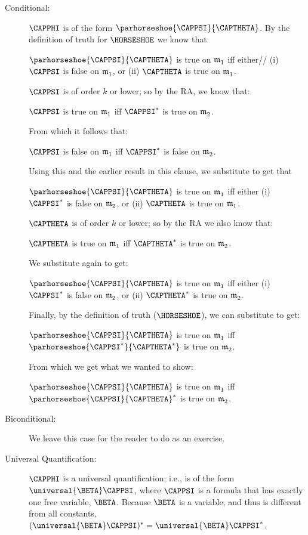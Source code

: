\begin{PROOF}
\begin{description}
\begin{description}
\item[Conditional:] $\CAPPHI$ is of the form $\parhorseshoe{\CAPPSI}{\CAPTHETA}$. By the definition of truth for $\HORSESHOE$ we know that
\begin{center}
$\parhorseshoe{\CAPPSI}{\CAPTHETA}$ is true on $\mathfrak{m^{\mathrm{}}_{\mathrm{1}}}$
  iff  either//
   (i) $\CAPPSI$ is false on $\mathfrak{m^{\mathrm{}}_{\mathrm{1}}}$, or (ii)
   $\CAPTHETA$ is true on $\mathfrak{m^{\mathrm{}}_{\mathrm{1}}}$.
\end{center}
$\CAPPSI$ is of order $k$ or lower; so by the RA, we know that:
\begin{center}
$\CAPPSI$ is true on $\mathfrak{m^{\mathrm{}}_{\mathrm{1}}}$ iff $\CAPPSI^*$ is true on $\mathfrak{m^{\mathrm{}}_{\mathrm{2}}}$.
\end{center}
From which it follows that:
\begin{center}
$\CAPPSI$ is false on $\mathfrak{m^{\mathrm{}}_{\mathrm{1}}}$ iff $\CAPPSI^*$ is false on $\mathfrak{m^{\mathrm{}}_{\mathrm{2}}}$.
\end{center}
Using this and the earlier result in this clause, we substitute to get that
\begin{center}
$\parhorseshoe{\CAPPSI}{\CAPTHETA}$ is true on $\mathfrak{m^{\mathrm{}}_{\mathrm{1}}}$
  iff  either  
	  (i) $\CAPPSI^*$ is false on $\mathfrak{m^{\mathrm{}}_{\mathrm{2}}}$,
        or (ii) $\CAPTHETA$ is true on $\mathfrak{m^{\mathrm{}}_{\mathrm{1}}}$.
\end{center}
$\CAPTHETA$ is of order $k$ or lower; so by the RA we also know that:
\begin{center}
$\CAPTHETA$ is true on $\mathfrak{m^{\mathrm{}}_{\mathrm{1}}}$ iff $\CAPTHETA^*$ is true on $\mathfrak{m^{\mathrm{}}_{\mathrm{2}}}$.
\end{center}
We substitute again to get:
\begin{center}
$\parhorseshoe{\CAPPSI}{\CAPTHETA}$ is true on $\mathfrak{m^{\mathrm{}}_{\mathrm{1}}}$
 iff either 
  (i) $\CAPPSI^*$ is false on $\mathfrak{m^{\mathrm{}}_{\mathrm{2}}}$,
 or (ii) $\CAPTHETA^*$ is true on $\mathfrak{m^{\mathrm{}}_{\mathrm{2}}}$.
\end{center}
Finally, by the definition of truth ($\HORSESHOE$), we can substitute to get:
\begin{center}
$\parhorseshoe{\CAPPSI}{\CAPTHETA}$ is true on $\mathfrak{m^{\mathrm{}}_{\mathrm{1}}}$
 iff $\parhorseshoe{\CAPPSI^*}{\CAPTHETA^*}$ is true on $\mathfrak{m^{\mathrm{}}_{\mathrm{2}}}$.
\end{center}
From which we get what we wanted to show:
\begin{center}
$\parhorseshoe{\CAPPSI}{\CAPTHETA}$ is true on $\mathfrak{m^{\mathrm{}}_{\mathrm{1}}}$ iff  $\parhorseshoe{\CAPPSI}{\CAPTHETA}^*$ is true on $\mathfrak{m^{\mathrm{}}_{\mathrm{2}}}$.
\end{center}

\item[Biconditional:] We leave this case for the reader to do as an exercise.

\item[Universal Quantification:] $\CAPPHI$ is a universal quantification; i.e., is of the form $\universal{\BETA}\CAPPSI$, where $\CAPPSI$ is a formula that has exactly one free variable, $\BETA$.  Because $\BETA$ is a variable, and thus is different from all constants, $(\universal{\BETA}\CAPPSI)^*=\universal{\BETA}\CAPPSI^*$.


\end{description}
\end{description}
\end{PROOF}
